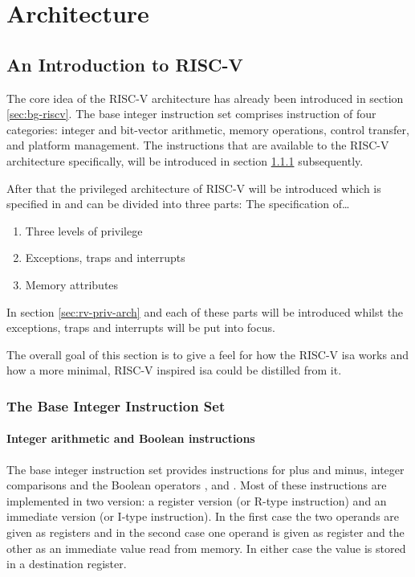 
\section{Architecture}
\label{sec:arch}

\subsection{An Introduction to RISC-V}

The core idea of the RISC-V architecture has already been introduced in section \ref{sec:bg-riscv}.
The base integer instruction set comprises instruction of four categories: integer and bit-vector arithmetic, memory operations, control transfer, and platform management.
The instructions that are available to the RISC-V architecture specifically, will be introduced in section \ref{sec:rv-base-int-isa} subsequently.

After that the privileged architecture of RISC-V will be introduced which is specified in  \cite{RiscVISAP} and can be divided into three parts:
The specification of\dots
\begin{enumerate}
    \item Three levels of privilege
    \item Exceptions, traps and interrupts
    \item Memory attributes
\end{enumerate}

In section \ref{sec:rv-priv-arch} and each of these parts will be introduced whilst the exceptions, traps and interrupts will be put into focus.

The overall goal of this section is to give a feel for how the RISC-V \gls{isa} works and how a more minimal, RISC-V inspired \gls{isa} could be distilled from it.

\subsubsection{The Base Integer Instruction Set}
\label{sec:rv-base-int-isa}

\paragraph{Integer arithmetic and Boolean instructions}
The base integer instruction set provides instructions for plus and minus, integer comparisons and the Boolean operators ,  and .
Most of these instructions are implemented in two version: a register version (or R-type instruction) and an immediate version (or I-type instruction).
In the first case the two operands are given as registers and in the second case one operand is given as register and the other as an immediate value read from memory.
In either case the value is stored in a destination register.

